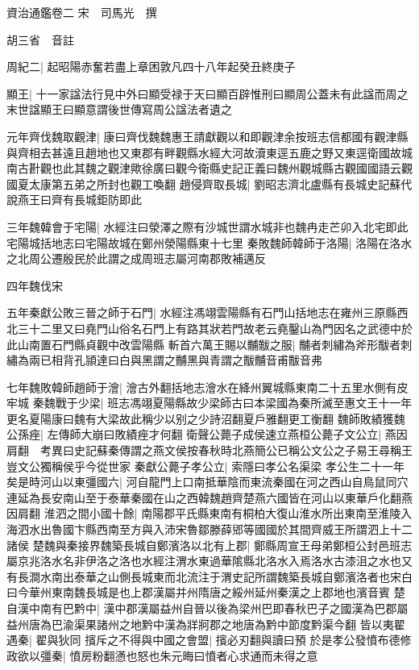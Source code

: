 資治通鑑卷二
宋　司馬光　撰

胡三省　音註

周紀二|{
	起昭陽赤奮若盡上章困敦凡四十八年起癸丑終庚子}


顯王|{
	十一家諡法行見中外曰顯受禄于天曰顯百辟惟刑曰顯周公蓋未有此諡而周之末世諡顯王曰顯意謂後世傳寫周公諡法者遺之}


元年齊伐魏取觀津|{
	康曰齊伐魏魏惠王請獻觀以和即觀津余按班志信都國有觀津縣與齊相去甚遠且趙地也又東郡有畔觀縣水經大河故瀆東逕五鹿之野又東逕衛國故城南古卙觀也此其魏之觀津歟徐廣曰觀今衛縣史記正義曰魏州觀城縣古觀國國語云觀國夏太康第五弟之所封也觀工喚翻}
趙侵齊取長城|{
	劉昭志濟北盧縣有長城史記蘇代說燕王曰齊有長城鉅防即此}


三年魏韓會于宅陽|{
	水經注曰滎澤之際有沙城世謂水城非也魏冉走芒卯入北宅即此宅陽城括地志曰宅陽故城在鄭州滎陽縣東十七里}
秦敗魏師韓師于洛陽|{
	洛陽在洛水之北周公遷殷民於此謂之成周班志屬河南郡敗補邁反}


四年魏伐宋

五年秦獻公敗三晉之師于石門|{
	水經注馮翊雲陽縣有石門山括地志在雍州三原縣西北三十二里又曰堯門山俗名石門上有路其狀若門故老云堯鑿山為門因名之武德中於此山南置石門縣貞觀中改雲陽縣}
斬首六萬王賜以黼黻之服|{
	黼者刺繡為斧形黻者刺繡為兩已相背孔頴達曰白與黑謂之黼黑與青謂之黻黼音甫黻音弗}


七年魏敗韓師趙師于澮|{
	澮古外翻括地志澮水在絳州翼城縣東南二十五里水側有皮牢城}
秦魏戰于少梁|{
	班志馮翊夏陽縣故少梁師古曰本梁國為秦所滅至惠文王十一年更名夏陽康曰魏有大梁故此稱少以别之少詩沼翻夏戶雅翻更工衡翻}
魏師敗績獲魏公孫痤|{
	左傳師大崩曰敗績痤才何翻}
衛聲公薨子成侯速立燕桓公薨子文公立|{
	燕因肩翻　考異曰史記蘇秦傳謂之燕文侯按春秋時北燕簡公已稱公文公之子易王尋稱王豈文公獨稱侯乎今從世家}
秦獻公薨子孝公立|{
	索隱曰孝公名渠梁}
孝公生二十一年矣是時河山以東彊國六|{
	河自龍門上口南抵華陰而東流秦國在河之西山自鳥鼠同穴連延為長安南山至于泰華秦國在山之西韓魏趙齊楚燕六國皆在河山以東華戶化翻燕因肩翻}
淮泗之間小國十餘|{
	南陽郡平氏縣東南有桐柏大復山淮水所出東南至淮陵入海泗水出魯國卞縣西南至方與入沛宋魯鄒滕薛郳等國國於其間齊威王所謂泗上十二諸侯}
楚魏與秦接界魏築長城自鄭濱洛以北有上郡|{
	鄭縣周宣王母弟鄭桓公封邑班志屬京兆洛水名非伊洛之洛也水經注渭水東過華隂縣北洛水入焉洛水古漆沮之水也又有長澗水南出泰華之山側長城東而北流注于渭史記所謂魏築長城自鄭濱洛者也宋白曰今華州東南魏長城是也上郡漢屬并州隋唐之綏州延州秦漢之上郡地也濱音賓}
楚自漢中南有巴黔中|{
	漢中郡漢屬益州自晉以後為梁州巴即春秋巴子之國漢為巴郡屬益州唐為巴渝渠果諸州之地黔中漢為牂牁郡之地唐為黔中節度黔渠今翻}
皆以夷翟遇秦|{
	翟與狄同}
擯斥之不得與中國之會盟|{
	擯必刃翻與讀曰預}
於是孝公發憤布德修政欲以彊秦|{
	憤房粉翻懣也怒也朱元晦曰憤者心求通而未得之意}


